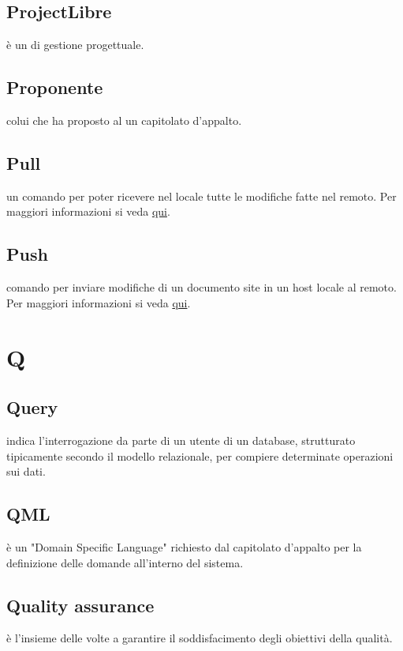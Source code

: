 \documentclass[12pt,a4paper]{article}
\begin{document}
\subsection{ProjectLibre} 
 è un  di gestione progettuale.

\subsection{Proponente} 
 colui che ha proposto al  un capitolato d'appalto.

\subsection{Pull} 
 un comando  per poter ricevere nel locale tutte le modifiche fatte nel  remoto. Per maggiori informazioni si veda \href{https://git-scm.com/docs/}{qui}.

\subsection{Push} 
 comando  per inviare modifiche di un documento site in un host locale al  remoto. Per maggiori informazioni si veda \href{https://git-scm.com/docs/}{qui}.


\newpage

\section{Q}


\subsection{Query} 
indica l'interrogazione da parte di un utente di un database, strutturato tipicamente secondo il modello relazionale, per compiere determinate operazioni sui dati.
\subsection{QML} 
 è un "Domain Specific Language" richiesto dal capitolato d'appalto per la definizione delle domande all'interno del sistema.

\subsection{Quality assurance} 
 è l'insieme delle  volte a garantire il soddisfacimento degli obiettivi della qualità.
\end{document}
